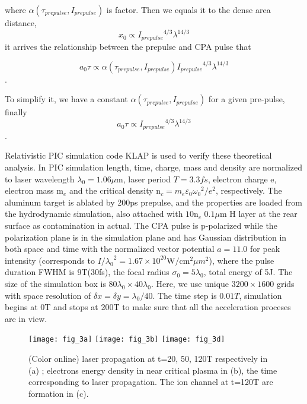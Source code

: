 \documentclass[aip,twocolumn,superscriptaddress,showpacs,amsmath]{revtex4}
\begin{document}
where $\alpha({\tau}_{prepulse}, I_{prepulse})$ is factor. Then we equals it
to the dense area distance,
\begin{equation*} x_0 \propto {I_{prepulse}}^{4/3} {\lambda}^{14/3} \end{equation*}
it arrives the relationship between the prepulse and CPA pulse that

\begin{equation*} a_0{\tau} \propto \alpha({\tau}_{prepulse}, I_{prepulse}) {I_{prepulse}}^{4/3}
{\lambda}^{14/3} \end{equation*}.


To simplify it, we have a constant $\alpha({\tau}_
{prepulse},I_{prepulse})$ for a given pre-pulse, finally
\begin{equation*} a_0{\tau} \propto {I_{prepulse}}^{4/3} {\lambda}^{14/3}
\end{equation*}.






Relativistic PIC simulation code KLAP\cite{KLAP,Yan2008} is used to verify
these theoretical analysis. In PIC simulation length, time, charge, mass and
density are normalized to laser wavelength ${\lambda}_0=1.06\mu $m, laser
period $T=3.3fs$, electron charge e, electron mass $\text{m}_e$ and the
critical density $\text{n}_c=m_e{\varepsilon}_0{{\omega}_0}^2/e^2$,
respectively. The aluminum target is ablated by 200ps prepulse, and the
properties are loaded from the hydrodynamic simulation, also attached with
$10\text{n}_c$ $0.1\mu $m H layer at the rear surface as contamination in
actual. The CPA pulse is p-polarized while the polarization plane is in the
simulation plane and has Gaussian distribution in both space and time with the
normalized vector potential $a=11.0$ for peak intensity (corresponds to
$I/{{\lambda}_0}^2=1.67{\times}10^{20}\text{W}/\text{{cm}}^2{\mu m}^2$), where
the pulse duration FWHM is 9T(30fs), the focal radius
${\sigma}_0=5{\lambda}_0$, total energy of 5J. The size of the simulation box
is $80{\lambda}_0\times 40 {\lambda}_0$. Here, we use unique $3200\times1600$
grids with space resolution of $\delta x = \delta y = {\lambda}_0/40$. The
time step is $0.01T$, simulation begins at 0T and stops at 200T to make sure
that all the acceleration proceses are in view.


\begin{figure}[htbp]
\texttt{[image: fig\_3a]}
\vspace{2.00mm}
\texttt{[image: fig\_3b]}
\vspace{2.00mm}
\texttt{[image: fig\_3d]}
\caption{\label{fig3}(Color online) laser propagation at t=20, 50, 120T 
respectively in (a) ; electrons energy density in near critical plasma in
(b), the time corresponding to laser propagation. The ion channel at t=120T
are formation in (c).}
\end{figure}
\end{document}
